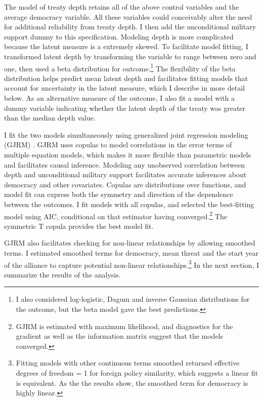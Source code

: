 \documentclass[12pt]{article}
\begin{document}
The model of treaty depth retains all of the above control variables and the average democracy variable. 
All these variables could conceivably alter the need for additional reliability from treaty depth. 
I then add the unconditional military support dummy to this specification. 
Modeling depth is more complicated because the latent measure is a extremely skewed.
To facilitate model fitting, I transformed latent depth by transforming the variable to range between zero and one, then used a beta distribution for outcome.\footnote{I also considered log-logistic, Dagum and inverse Gaussian distributions for the outcome, but the beta model gave the best predictions.}
The flexibility of the beta distribution helps predict mean latent depth and facilitates fitting models that account for uncertainty in the latent measure, which I describe in more detail below. 
As an alternative measure of the outcome, I also fit a model with a dummy variable indicating whether the latent depth of the treaty was greater than the median depth value. 


I fit the two models simultaneously using generalized joint regression modeling (GJRM) \citep{Braumoelleretal2018}.
GJRM uses copulas to model correlations in the error terms of multiple equation models, which makes it more flexible than parametric models and facilitates causal inference. 
Modeling any unobserved correlation between depth and unconditional military support facilitates accurate inferences about democracy and other covariates. 
Copulas are distributions over functions, and model fit can express both the symmetry and direction of the dependence between the outcomes. 
I fit models with all copulas, and selected the best-fitting model using AIC, conditional on that estimator having converged.\footnote{GJRM is estimated with maximum likelihood, and diagnostics for the gradient as well as the information matrix suggest that the models converged.} 
The symmetric T copula provides the best model fit.


GJRM also facilitates checking for non-linear relationships by allowing smoothed terms. 
I estimated smoothed terms for democracy, mean threat and the start year of the alliance to capture potential non-linear relationships.\footnote{Fitting models with other continuous terms smoothed returned effective degrees of freedom = 1 for foreign policy similarity, which suggests a linear fit is equivalent. As the the results show, the smoothed term for democracy is highly linear.}  
In the next section, I summarize the results of the analysis. 
\end{document}
